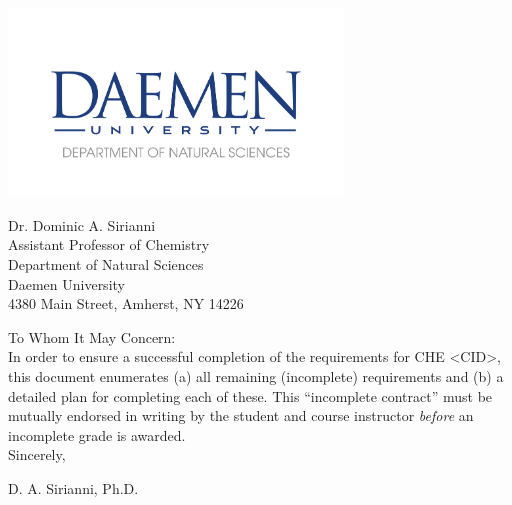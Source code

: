 

\pagestyle{fancy}
\date{\today}

\begin{center}
\includegraphics[width=3.5in]{natsci_letterhead_logo.png} %
\end{center}
{\noindent Dr. Dominic A. Sirianni\\
Assistant Professor of Chemistry\\
Department of Natural Sciences\\
Daemen University\\
4380 Main Street, Amherst, NY 14226\\

\date{\today}
}

\thispagestyle{empty}


\noindent To Whom It May Concern:\\

In order to ensure a successful completion of the requirements for CHE <CID>,
this document enumerates (a) all remaining (incomplete) requirements and (b) a
detailed plan for completing each of these.  This ``incomplete contract'' must
be mutually endorsed in writing by the student and course instructor {\em before}
an incomplete grade is awarded.\\


\noindent Sincerely,

\vspace{2 cm}

\noindent D. A. Sirianni, Ph.D.



